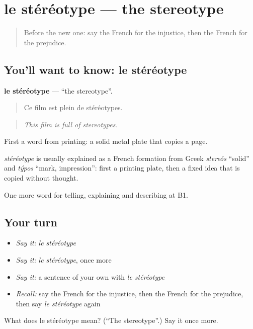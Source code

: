 \section[le stéréotype]{le stéréotype — the stereotype}

\label{lesson:FR-C364-stereotype}



\begin{quote}
Before the new one: say the French for the injustice, then the French for the prejudice.
\end{quote}

\subsection*{You'll want to know: le stéréotype}
\textbf{le stéréotype} — \textquotedblleft{}the stereotype\textquotedblright{}.

\begin{quote}
Ce film est plein de stéréotypes.
\end{quote}

\begin{quote}
\emph{This film is full of stereotypes.}
\end{quote}

First a word from printing: a solid metal plate that copies a page.

\begin{cousinweb}
\emph{stéréotype} is usually explained as a French formation from Greek \emph{stereós} \textquotedblleft{}solid\textquotedblright{} and \emph{týpos} \textquotedblleft{}mark, impression\textquotedblright{}: first a printing plate, then a fixed idea that is copied without thought.
\end{cousinweb}

\begin{grammarlens}[title={What you've built}]
One more word for telling, explaining and describing at B1.
\end{grammarlens}

\subsection*{Your turn}
\begin{itemize}
\raggedright
  \item \emph{Say it:} \emph{le stéréotype}
  \item \emph{Say it:} \emph{le stéréotype}, once more
  \item \emph{Say it:} a sentence of your own with \emph{le stéréotype}
  \item \emph{Recall:} say the French for the injustice, then the French for the prejudice, then say \emph{le stéréotype} again
\end{itemize}

\begin{tcolorbox}[breakable,colback=teal!4,colframe=teal!35!black,title={Before you move on}]
What does le stéréotype mean? (\textquotedblleft{}The stereotype\textquotedblright{}.) Say it once more.
\end{tcolorbox}

